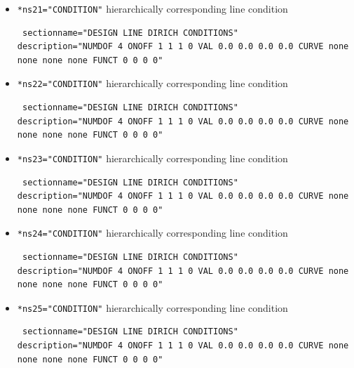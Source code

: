 \begin{itemize}
 \item \verb|*ns21="CONDITION"| \qquad hierarchically corresponding line condition
\begin{small} \begin{verbatim} sectionname="DESIGN LINE DIRICH CONDITIONS"
description="NUMDOF 4 ONOFF 1 1 1 0 VAL 0.0 0.0 0.0 0.0 CURVE none none none none FUNCT 0 0 0 0"
\end{verbatim} \end{small}

 \item \verb|*ns22="CONDITION"| \qquad hierarchically corresponding line condition
\begin{small} \begin{verbatim} sectionname="DESIGN LINE DIRICH CONDITIONS"
description="NUMDOF 4 ONOFF 1 1 1 0 VAL 0.0 0.0 0.0 0.0 CURVE none none none none FUNCT 0 0 0 0"
\end{verbatim} \end{small} 

\item \verb|*ns23="CONDITION"| \qquad hierarchically corresponding line condition
\begin{small} \begin{verbatim} sectionname="DESIGN LINE DIRICH CONDITIONS"
description="NUMDOF 4 ONOFF 1 1 1 0 VAL 0.0 0.0 0.0 0.0 CURVE none none none none FUNCT 0 0 0 0"
\end{verbatim} \end{small}

 \item \verb|*ns24="CONDITION"| \qquad hierarchically corresponding line condition
\begin{small} \begin{verbatim} sectionname="DESIGN LINE DIRICH CONDITIONS"
description="NUMDOF 4 ONOFF 1 1 1 0 VAL 0.0 0.0 0.0 0.0 CURVE none none none none FUNCT 0 0 0 0"
\end{verbatim} \end{small} 

\item \verb|*ns25="CONDITION"| \qquad hierarchically corresponding line condition
\begin{small} \begin{verbatim} sectionname="DESIGN LINE DIRICH CONDITIONS"
description="NUMDOF 4 ONOFF 1 1 1 0 VAL 0.0 0.0 0.0 0.0 CURVE none none none none FUNCT 0 0 0 0"
\end{verbatim} \end{small}


\end{itemize}
